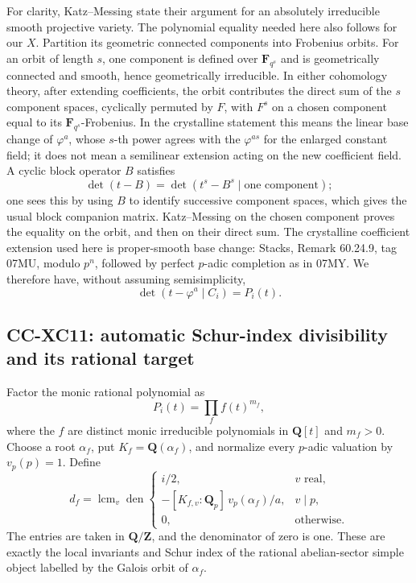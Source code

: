 For clarity, Katz--Messing state their argument for an absolutely
irreducible smooth projective variety. The polynomial equality needed
here also follows for our \(X\). Partition its geometric connected
components into Frobenius orbits. For an orbit of length \(s\), one
component is defined over \(\mathbf F_{q^s}\) and is geometrically
connected and smooth, hence geometrically irreducible. In either
cohomology theory, after extending coefficients, the orbit contributes
the direct sum of the \(s\) component spaces, cyclically permuted by
\(F\), with \(F^s\) on a chosen component equal to its
\(\mathbf F_{q^s}\)-Frobenius. In the crystalline statement this means
the linear base change of \(\varphi^a\), whose \(s\)-th power agrees
with the \(\varphi^{as}\) for the enlarged constant field; it does not
mean a semilinear extension acting on the new coefficient field. A
cyclic block operator \(B\) satisfies \[
 \det(t-B)=\det(t^s-B^s\mid\text{one component});
                                                        \tag{CC-XC.R12}
\] one sees this by using \(B\) to identify successive component spaces,
which gives the usual block companion matrix. Katz--Messing on the
chosen component proves the equality on the orbit, and then on their
direct sum. The crystalline coefficient extension used here is
proper-smooth base change: Stacks, Remark 60.24.9, tag 07MU, modulo
\(p^n\), followed by perfect \(p\)-adic completion as in 07MY. We
therefore have, without assuming semisimplicity, \[
 \det(t-\varphi^a\mid C_i)=P_i(t).
                                                        \tag{CC-XC.R13}
\]

\subsection{CC-XC11: automatic Schur-index divisibility and its rational
target}\label{cc-xc11-automatic-schur-index-divisibility-and-its-rational-target}

Factor the monic rational polynomial as \[
 P_i(t)=\prod_f f(t)^{m_f},
                                                        \tag{CC-XC.R14}
\] where the \(f\) are distinct monic irreducible polynomials in
\(\mathbf Q[t]\) and \(m_f>0\). Choose a root \(\alpha_f\), put
\(K_f=\mathbf Q(\alpha_f)\), and normalize every \(p\)-adic valuation by
\(v_p(p)=1\). Define \[
 d_f=\operatorname{lcm}_v
 \operatorname{den}\begin{cases}
 i/2,&v\text{ real},\\[2pt]
 -[K_{f,v}:\mathbf Q_p]\,v_p(\alpha_f)/a,&v\mid p,\\[2pt]
 0,&\text{otherwise}.
 \end{cases}
                                                        \tag{CC-XC.R15}
\] The entries are taken in \(\mathbf Q/\mathbf Z\), and the denominator
of zero is one. These are exactly the local invariants and Schur index
of the rational abelian-sector simple object labelled by the Galois
orbit of \(\alpha_f\).

